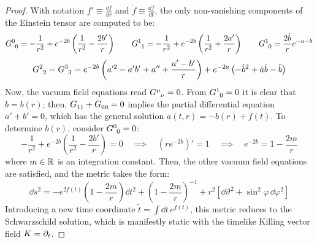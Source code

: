 \begin{proofbox}
\begin{proof}
    With notation $ f' \equiv \frac{\dd f}{\dd r} $ and $ \dot{f} \equiv \frac{\dd f}{\dd t} $, the only non-vanishing components of the Einstein tensor are computed to be:
    \begin{equation*}
      \tensor{G}{^0_0} = - \frac{1}{r^2} + e^{-2b} \left( \frac{1}{r^2} - \frac{2b'}{r} \right)
      \qquad
      \tensor{G}{^1_1} = - \frac{1}{r^2} + e^{-2b} \left( \frac{1}{r^2} + \frac{2a'}{r} \right)
      \qquad
      \tensor{G}{^1_0} = \frac{2\dot{b}}{r} e^{-a -b}
    \end{equation*}
    \begin{equation*}
      \tensor{G}{^2_2} = \tensor{G}{^3_3} = e^{-2b} \left( a'^2 - a'b' + a'' + \frac{a' - b'}{r} \right) + e^{-2a} \left( -\dot{b}^2 + \dot{a} \dot{b} - \ddot{b} \right)
    \end{equation*}
    Now, the vacuum field equations read $ \tensor{G}{^\mu_\nu} = 0 $. From $ \tensor{G}{^1_0} = 0 $ it is clear that $ b = b(r) $; then, $ \tensor{G}{_1_1} + \tensor{G}{_0_0} = 0 $ implies the partial differential equation $ a' + b' = 0 $, which has the general solution $ a(t,r) = -b(r) + f(t) $. To determine $ b(r) $, consider $ \tensor{G}{^0_0} = 0 $:
    \begin{equation*}
      - \frac{1}{r^2} + e^{-2b} \left( \frac{1}{r^2} - \frac{2b'}{r} \right) = 0
      \quad \implies \quad
      \left( r e^{-2b} \right)' = 1
      \quad \implies \quad
      e^{-2b} = 1 - \frac{2m}{r}
    \end{equation*}
    where $ m \in \mathbb{R} $ is an integration constant. Then, the other vacuum field equations are satisfied, and the metric takes the form:
    \begin{equation*}
      \dd s^2 = - e^{2f(t)} \left( 1 - \frac{2m}{r} \right) \dd t^2 + \left( 1 - \frac{2m}{r} \right)^{-1} + r^2 \left[ \dd \vartheta^2 + \sin^2 \varphi \, \dd \varphi^2 \right]
    \end{equation*}
    Introducing a new time coordinate $ \tilde{t} = \int \dd t \, e^{f(t)} $, this metric reduces to the Schwarzschild solution, which is manifestly static with the timelike Killing vector field $ K = \partial_t $.
  \end{proof}
\end{proofbox}

